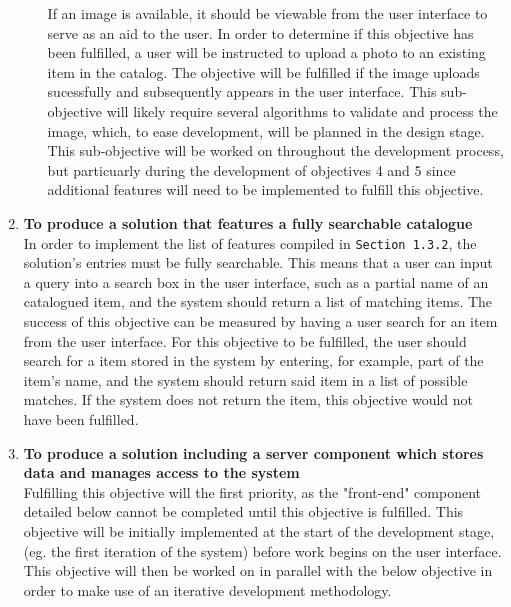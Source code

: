 \documentclass[../../../main.tex]{subfiles}
\begin{document}
\begin{enumerate}
\begin{enumerate}
                        If an image is available, it should be viewable from the user interface to serve as an aid to the user.
                        In order to determine if this objective has been fulfilled, a user will be instructed to upload a photo to an existing item in the catalog.
                        The objective will be fulfilled if the image uploads sucessfully and subsequently appears in the user interface.
                        This sub-objective will likely require several algorithms to validate and process the image, which, to ease development, will be planned in the design stage.
                        This sub-objective will be worked on throughout the development process, but particuarly during the development
                        of objectives 4 and 5 since additional features will need to be implemented to fulfill this objective.
            \end{enumerate}

      \item \textbf{To produce a solution that features a fully searchable catalogue}\\
            In order to implement the list of features compiled in \lstinline{Section 1.3.2}, the solution's entries
            must be fully searchable. This means that a user can input a query into a search box in the user interface,
            such as a partial name of an catalogued item, and the system should return a list of matching items.
            The success of this objective can be measured by having a user search for an item from the user interface.
            For this objective to be fulfilled, the user should search for a item stored in the system by entering,
            for example, part of the item's name, and the system should return said item in a list of possible
            matches. If the system does not return the item, this objective would not have been fulfilled.

      \item \textbf{To produce a solution including a server component which stores data and manages access to the system}\\
            Fulfilling this objective will the first priority, as the "front-end" component detailed below cannot be completed
            until this objective is fulfilled. This objective will be initially implemented at the start of the development
            stage, (eg. the first iteration of the system) before work begins on the user interface. This objective will then
            be worked on in parallel with the below objective in order to make use of an iterative development methodology.


\end{enumerate}
\end{document}
